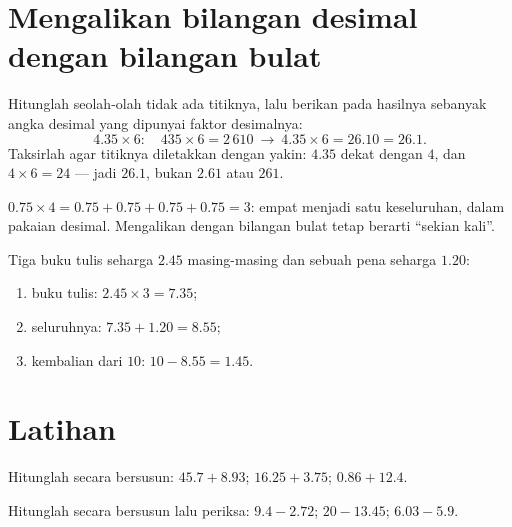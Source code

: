 \section{Mengalikan bilangan desimal dengan bilangan bulat}

\begin{method}\label{met:g5:decimalops:mult}
Hitunglah seolah-olah tidak ada titiknya, lalu berikan pada hasilnya
sebanyak angka desimal yang dipunyai faktor desimalnya:
\[
4.35 \times 6: \quad 435 \times 6 = 2\,610
\ \to\ 4.35 \times 6 = 26.10 = 26.1 .
\]
Taksirlah agar titiknya diletakkan dengan yakin: $4.35$ dekat dengan
$4$, dan $4 \times 6 = 24$ --- jadi $26.1$, bukan $2.61$ atau $261$.
\end{method}

\begin{example}\label{ex:g5:decimalops:mult}
$0.75 \times 4 = 0.75 + 0.75 + 0.75 + 0.75 = 3$: empat 
menjadi satu keseluruhan, dalam pakaian desimal. Mengalikan dengan
bilangan bulat tetap berarti ``sekian kali''.
\end{example}

\begin{example}[Berbelanja]\label{ex:g5:decimalops:shopping}
Tiga buku tulis seharga $2.45$ masing-masing dan sebuah pena seharga $1.20$:
\begin{enumerate}
  \item buku tulis: $2.45 \times 3 = 7.35$;
  \item seluruhnya: $7.35 + 1.20 = 8.55$;
  \item kembalian dari $10$: $10 - 8.55 = 1.45$.
\end{enumerate}
\end{example}

\section{Latihan}

\begin{exercise}[$\star$]\label{exo:g5:decimalops:1}
Hitunglah secara bersusun: $45.7 + 8.93$; \quad $16.25 + 3.75$; \quad
$0.86 + 12.4$.
\end{exercise}

\begin{exercise}[$\star$]\label{exo:g5:decimalops:2}
Hitunglah secara bersusun lalu periksa: $9.4 - 2.72$; \quad
$20 - 13.45$; \quad $6.03 - 5.9$.
\end{exercise}

